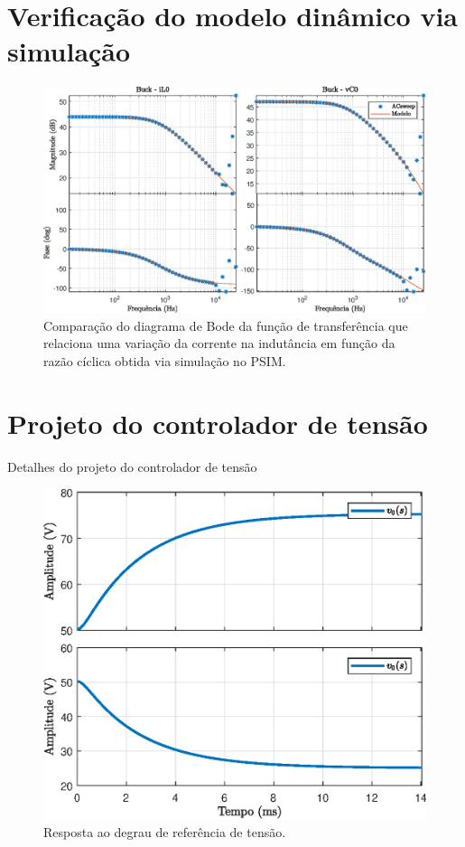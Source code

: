 \section{Verificação do modelo dinâmico via simulação}


\begin{figure}[!ht]
	\centering
	\includegraphics[width=1\linewidth]{Figs/BuckACSweep}
	\caption{Comparação do diagrama de Bode da função de transferência que relaciona uma variação da corrente na indutância em função da razão cíclica obtida via simulação no PSIM.}
	\label{fig:buck-il0}
\end{figure}


\section{Projeto do controlador de tensão}
Detalhes do projeto do controlador de tensão


\begin{figure}[!ht]
	\centering
	\includegraphics[width=0.9\linewidth]{Figs/BuckStepResponse1malha}
	\caption{Resposta ao degrau de referência de tensão.}
	\label{fig:stepresponse1malha}
\end{figure}

